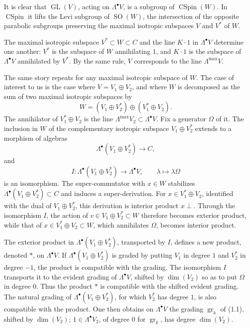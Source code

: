 \documentclass[11pt]{article}
\newcommand{\GL}{\operatorname{GL}}
\newcommand{\SO}{\operatorname{SO}}
\newcommand{\CSpin}{\operatorname{CSpin}}
\newcommand{\gr}{\operatorname{gr}}
\theoremstyle{deligne}
\begin{document}
It is clear that $\GL(V)$, acting on $\Lambda^\bullet V$, is a subgroup of $\CSpin(W)$. In $\CSpin$ it lifts the Levi subgroup of $\SO(W)$, the intersection of the opposite parabolic subgroups preserving the maximal isotropic subspaces $V$ and $V^*$ of $W$.

The maximal isotropic subspace $V^*\subset W\subset C$ and the line $K\cdot1$ in $\Lambda^\bullet V$ determine one another: $V^*$ is the subspace of $W$ annihilating $1$, and $K\cdot1$ is the subspace of $\Lambda^\bullet V$ annihilated by $V^*$. By the same rule, $V$ corresponds to the line $\Lambda^{\max}V$.

The same story repeats for any maximal isotropic subspace of $W$. The case of interest to us is the case where $V=V_1\oplus V_2$, and where $W$ is decomposed as the sum of two maximal isotropic subspaces by
\[
W=(V_1\oplus V_2^*)\oplus(V_1^*\oplus V_2).
\]
The annihilator of $V_1^*\oplus V_2$ is the line $\Lambda^{\max}V_2\subset\Lambda^\bullet V$. Fix a generator $\Omega$ of it. The inclusion in $W$ of the complementary isotropic subspace $V_1\oplus V_2^*$ extends to a morphism of algebras
\[
\Lambda^\bullet(V_1\oplus V_2^*)\longrightarrow C,
\]
and
\begin{equation}\tag{3.3}
I:\Lambda^\bullet(V_1\oplus V_2^*)\longrightarrow\Lambda^\bullet V,
\qquad \lambda\longmapsto \lambda\Omega
\end{equation}
is an isomorphism. The super-commutator with $x\in W$ stabilizes $\Lambda^\bullet(V_1\oplus V_2^*)\subset C$ and induces a super-derivation. For $x\in V_1^*\oplus V_2$, identified with the dual of $V_1\oplus V_2^*$, this derivation is interior product $x\perp$. Through the isomorphism $I$, the action of $v\in V_1\oplus V_2^*\subset W$ therefore becomes exterior product, while that of $x\in V_1^*\oplus V_2\subset W$, which annihilates $\Omega$, becomes interior product.

The exterior product in $\Lambda^\bullet(V_1\oplus V_2^*)$, transported by $I$, defines a new product, denoted $*$, on $\Lambda^\bullet V$. If $\Lambda^\bullet(V_1\oplus V_2^*)$ is graded by putting $V_1$ in degree $1$ and $V_2^*$ in degree $-1$, the product is compatible with the grading. The isomorphism $I$ transports it to the evident grading of $\Lambda^\bullet V$, shifted by $\dim(V_2)$ so as to put $\Omega$ in degree $0$. Thus the product $*$ is compatible with the shifted evident grading. The natural grading of $\Lambda^\bullet(V_1\oplus V_2^*)$, for which $V_2^*$ has degree $1$, is also compatible with the product. One then obtains on $\Lambda^\bullet V$ the grading $\gr_k$ of (1.1), shifted by $\dim(V_2)$; $1\in\Lambda^\bullet V_2$, of degree $0$ for $\gr_k$, has degree $\dim(V_2)$.
\end{document}
